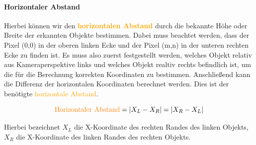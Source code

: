 \documentclass[12pt]{article}
\theoremstyle{definition}
\begin{document}
\paragraph{Horizontaler Abstand}
\begin{flushleft}
Hierbei können wir den \textbf{\textcolor{orange}{horizontalen Abstand}} durch die bekannte Höhe oder Breite der erkannten Objekte bestimmen. Dabei muss beachtet werden, dass der Pixel (0,0) in der oberen linken Ecke und der Pixel (m,n) in der unteren rechten Ecke zu finden ist. Es muss also zuerst festgestellt werden, welches Objekt relativ aus Kameraperspektive links und welches Objekt realtiv rechts befindlich ist, um die für die Berechnung korrekten Koordinaten zu bestimmen. Anschließend kann die Differenz der horizontalen Koordinaten berechnet werden. Dies ist der benötigte \textcolor{orange}{horizontale Abstand}.

\begin{equation}
\text{\textcolor{orange}{Horizontaler Abstand}} = | X_L - X_R | = | X_R - X_L |
\end{equation}

Hierbei bezeichnet $X_L$ die X-Koordinate des rechten Randes des linken Objekts, $X_R$ die X-Koordinate des linken Randes des rechten Objekts.
\end{flushleft}
\end{document}
